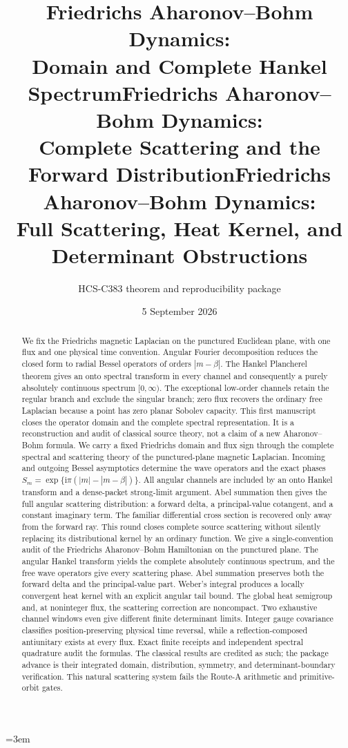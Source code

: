 \documentclass[10pt]{article}
\title{Friedrichs Aharonov--Bohm Dynamics:\\Domain and Complete Hankel Spectrum}
\title{Friedrichs Aharonov--Bohm Dynamics:\\Complete Scattering and the Forward Distribution}
\title{Friedrichs Aharonov--Bohm Dynamics:\\Full Scattering, Heat Kernel, and Determinant Obstructions}
\author{HCS-C383 theorem and reproducibility package}
\date{5 September 2026}
\newcommand{\ii}{\mathrm i}
\begin{document}
\emergencystretch=3em
\maketitle
\begin{abstract}
\ifcase\CRevisionRound
We fix the Friedrichs magnetic Laplacian on the punctured Euclidean plane,
with one flux and one physical time convention. Angular Fourier decomposition
reduces the closed form to radial Bessel operators of orders $|m-\beta|$.
The Hankel Plancherel theorem gives an onto spectral transform in every channel
and consequently a purely absolutely continuous spectrum $[0,\infty)$.
The exceptional low-order channels retain the regular branch and exclude the
singular branch; zero flux recovers the ordinary free Laplacian because a point
has zero planar Sobolev capacity. This first manuscript closes the operator
domain and the complete spectral representation. It is a reconstruction and
audit of classical source theory, not a claim of a new Aharonov--Bohm formula.
\or
We carry a fixed Friedrichs domain and flux sign through the complete spectral
and scattering theory of the punctured-plane magnetic Laplacian. Incoming and
outgoing Bessel asymptotics determine the wave operators and the exact phases
$S_m=\exp\{\ii\pi(|m|-|m-\beta|)\}$. All angular channels are included by an
onto Hankel transform and a dense-packet strong-limit argument. Abel summation
then gives the full angular scattering distribution: a forward delta, a
principal-value cotangent, and a constant imaginary term. The familiar
differential cross section is recovered only away from the forward ray.
This round closes complete source scattering without silently replacing its
distributional kernel by an ordinary function.
\else
We give a single-convention audit of the Friedrichs Aharonov--Bohm Hamiltonian
on the punctured plane. The angular Hankel transform yields the complete
absolutely continuous spectrum, and the free wave operators give every
scattering phase. Abel summation preserves both the forward delta and the
principal-value part. Weber's integral produces a locally convergent heat
kernel with an explicit angular tail bound. The global heat semigroup and,
at noninteger flux, the scattering correction are noncompact. Two exhaustive
channel windows even give different finite determinant limits. Integer gauge
covariance classifies position-preserving physical time reversal, while a
reflection-composed antiunitary exists at every flux. Exact finite receipts
and independent spectral quadrature audit the formulas. The classical results
are credited as such; the package advance is their integrated domain,
distribution, symmetry, and determinant-boundary verification. This natural
scattering system fails the Route-A arithmetic and primitive-orbit gates.
\fi
\end{abstract}
\end{document}
